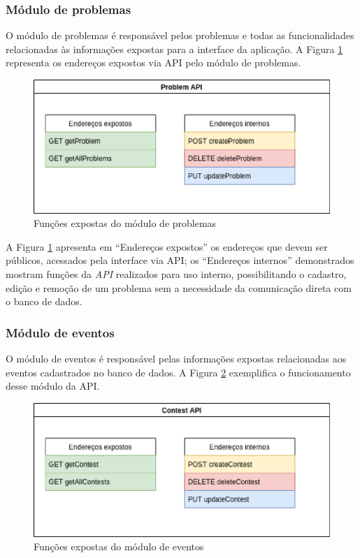 \subsubsection{Módulo de problemas}
\label{subsubsec:moduloDeProblemas}

O módulo de problemas é responsável pelos problemas e todas as funcionalidades relacionadas às informações expostas para a interface da aplicação. A Figura \ref{fig:problems_endpoints} representa os endereços expostos via API pelo módulo de problemas.

\begin{figure}[H]
    \centering
    \includegraphics[keepaspectratio=true,scale=0.5]{figuras/problems_endpoins.eps}
    \caption{Funções expostas do módulo de problemas}
    \label{fig:problems_endpoints}
\end{figure}

A Figura \ref{fig:problems_endpoints} apresenta em ``Endereços expostos'' os endereços que devem ser públicos, acessados pela interface via API; os ``Endereços internos'' demonstrados mostram funções da \textit{API} realizados para uso interno, possibilitando o cadastro, edição e remoção de um problema sem a necessidade da comunicação direta com o banco de dados.

\subsubsection{Módulo de eventos}
\label{subsec:moduloDeEventos}

O módulo de eventos é responsável pelas informações expostas relacionadas aos eventos cadastrados no banco de dados. A Figura \ref{fig:contests_endpoint} exemplifica o funcionamento desse módulo da API.

\begin{figure}[H]
    \centering
    \includegraphics[keepaspectratio=true,scale=0.5]{figuras/contests_endpoint.eps}
    \caption{Funções expostas do módulo de eventos}
    \label{fig:contests_endpoint}
\end{figure}

